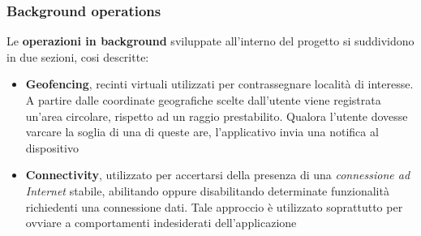 \documentclass{article}
\begin{document}
    \subsubsection*{Background operations}
    Le \textbf{operazioni in background} sviluppate all'interno del progetto si suddividono in due sezioni, cosi descritte:
    \begin{itemize}
        \renewcommand{\labelitemi}{-}
        \item \textbf{Geofencing}, recinti virtuali utilizzati per contrassegnare località di interesse. A partire dalle coordinate geografiche scelte dall'utente viene registrata un'area circolare, rispetto ad un raggio prestabilito. Qualora l'utente dovesse varcare la soglia di una di queste are, l'applicativo invia una notifica al dispositivo
        \item \textbf{Connectivity}, utilizzato per accertarsi della presenza di una \textit{connessione ad Internet} stabile, abilitando oppure disabilitando determinate funzionalità richiedenti una connessione dati. Tale approccio è utilizzato soprattutto per ovviare a comportamenti indesiderati dell'applicazione
    \end{itemize}
    \begin{center}
        \begin{figure}[H]
            \centering
        \end{figure}
    \end{center}
\end{document}
